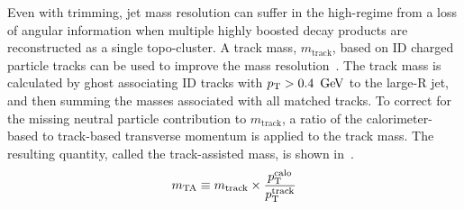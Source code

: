 Even with trimming, jet mass resolution can suffer in the high-\pT regime from a loss of angular information when multiple highly boosted decay products are reconstructed as a single topo-cluster. A track mass, $m_{\textrm{track}}$, based on ID charged particle tracks can be used to improve the mass resolution~\cite{jet_track_mass}. The track mass is calculated by ghost associating ID tracks with $\pT>0.4\,\GeV$ to the large-R jet, and then summing the masses associated with all matched tracks. To correct for the missing neutral particle contribution to $m_{\textrm{track}}$, a ratio of the calorimeter-based to track-based transverse momentum is applied to the track mass. The resulting quantity, called the track-assisted mass, is shown in~\Eqn{\ref{eq:m_ta}}.
\begin{equation}
m_{\textrm{TA}} \equiv m_{\textrm{track}}\times\frac{p_{\rm T}^{\textrm{calo}}}{p_{\rm T}^{\textrm{track}}}
\label{eq:m_ta}
\end{equation}

